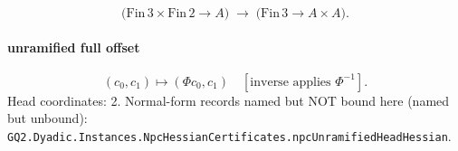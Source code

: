 \[\bigl(\mathrm{Fin}\,3\times\mathrm{Fin}\,2\to A\bigr)\;\longrightarrow\;\bigl(\mathrm{Fin}\,3\to A\times A\bigr).\]
\paragraph{unramified full offset}
\[(c_0,c_1)\mapsto(\Phi c_0,c_1)\quad[\text{inverse applies }\Phi^{-1}].\]
Head coordinates: 2. Normal-form records named but NOT bound here (named but unbound): \texttt{GQ2.Dyadic.Instances.NpcHessianCertificates.npcUnramifiedHeadHessian}.
